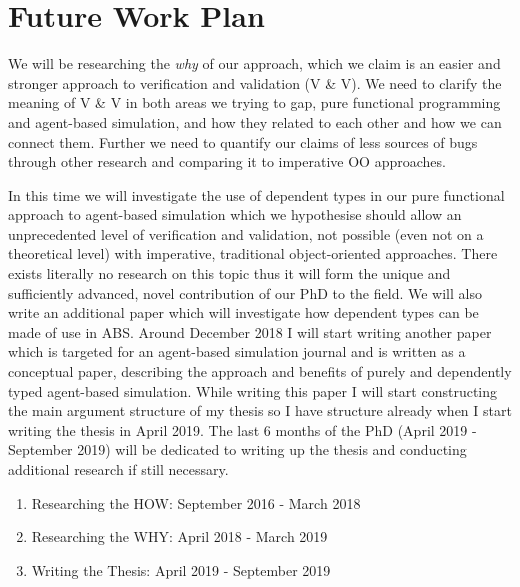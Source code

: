 \chapter{Future Work Plan}
\label{chap:future}

We will be researching the \textit{why} of our approach, which we claim is an easier and stronger approach to verification and validation (V \& V). We need to clarify the meaning of V \& V in both areas we trying to gap, pure functional programming and agent-based simulation, and how they related to each other and how we can connect them. Further we need to quantify our claims of less sources of bugs through other research and comparing it to imperative OO approaches.

In this time we will investigate the use of dependent types in our pure functional approach to agent-based simulation which we hypothesise should allow an unprecedented level of verification and validation, not possible (even not on a theoretical level) with imperative, traditional object-oriented approaches. There exists literally no research on this topic thus it will form the unique and sufficiently advanced, novel contribution of our PhD to the field. We will also write an additional paper which will investigate how dependent types can be made of use in ABS.
Around December 2018 I will start writing another paper which is targeted for an agent-based simulation journal and is written as a conceptual paper, describing the approach and benefits of purely and dependently typed agent-based simulation. While writing this paper I will start constructing the main argument structure of my thesis so I have structure already when I start writing the thesis in April 2019. The last 6 months of the PhD (April 2019 - September 2019) will be dedicated to writing up the thesis and conducting additional research if still necessary.

\begin{enumerate}
	\item Researching the HOW: September 2016 - March 2018
	\item Researching the WHY: April 2018 - March 2019
	\item Writing the Thesis: April 2019 - September 2019
\end{enumerate}

%
%
%
%


